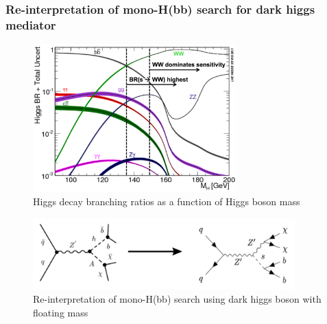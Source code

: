 \documentclass[12pt]{article}
\begin{document}
\subsubsection{Re-interpretation of mono-H(bb) search for dark higgs mediator}
\begin{figure}[H]
	\centering
	\includegraphics[width=0.7\textwidth]{figures/BR_vs_mass.png}
	\caption{Higgs decay branching ratios as a function of Higgs boson mass}
	\label{fig:higgsbrs}
\end{figure}
\begin{figure}[H]
	\centering
	\includegraphics[width=0.9\textwidth]{figures/monohbb_reinterpretation.png}
	\caption{Re-interpretation of mono-H(bb) search using dark higgs boson with floating mass}
	\label{fig:monohbbreinterp}
\end{figure}
\end{document}
